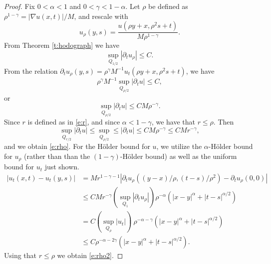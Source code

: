 \documentclass{amsart}
\newtheorem{lemma}[theorem]{Lemma}
\numberwithin{equation}{section}
\begin{document}
\begin{proof}
 Fix $0<\alpha<1$ and $0<\gamma<1-\alpha$. Let $\rho$ be defined as $\rho^{1-\gamma}=|\nabla u(x,t)|/M$, and rescale with 
 \[
 u_\rho(y,s)=\frac{u(\rho y+x,\rho^2s+t)}{M\rho^{1-\gamma}}.
 \]
 From Theorem \ref{t:hodograph} 
 we have 
 \[
 \sup_{Q_{1/2}}|\partial_t u_\rho| \leq C.
 \]
 From the relation $\partial_t u_\rho(y,s)=\rho^{\gamma}M^{-1} u_t(\rho y+x,\rho^2s+t)$, we have
 \[
 \rho^{\gamma}M^{-1} \sup_{Q_{\rho/2}} |\partial_t u| \leq C,
 \]
 or 
 \[
 \sup_{Q_{\rho/2}} |\partial_t u| \leq CM \rho^{-\gamma}.
 \]
 Since $r$ is defined as in \eqref{e:r}, and since $\alpha<1-\gamma$, we have that $r \leq \rho$. Then 
  \[
 \sup_{Q_{r/2}} |\partial_t u| \leq \sup_{Q_{\rho/2}} \leq  |\partial_t u| \leq CM \rho^{-\gamma}
 \leq CM r^{-\gamma},
 \]
 and we obtain \eqref{e:rho}. 
  For the H\"older bound for $u$, we utilize the $\alpha$-H\"older bound for $u_\rho$ (rather than than the $(1-\gamma)$-H\"older bound) as well as the uniform bound for $u_t$ just shown. 
 \[
 \begin{aligned}
 |u_t(x,t)-u_t(y,s)|&=Mr^{1-\gamma-1}
 |\partial_t u_\rho((y-x)/\rho,(t-s)/\rho^2)-\partial_t u_\rho(0,0)|\\
 &\leq C Mr^{-\gamma}(\sup_{Q_1} |\partial_t u_\rho|) \rho^{-\alpha}(|x-y|^{\alpha}+|t-s|^{\alpha/2}) \\
 &= C (\sup_{Q_\rho} |u_t|) \ \rho^{-\alpha-\gamma}(|x-y|^{\alpha}+|t-s|^{\alpha/2}) \\
 &\leq C \rho^{-\alpha-2\gamma} (|x-y|^{\alpha}+|t-s|^{\alpha/2}). 
 \end{aligned}
 \]
 Using that $r\leq \rho$ we obtain \eqref{e:rho2}. 
\end{proof}


\end{document}
